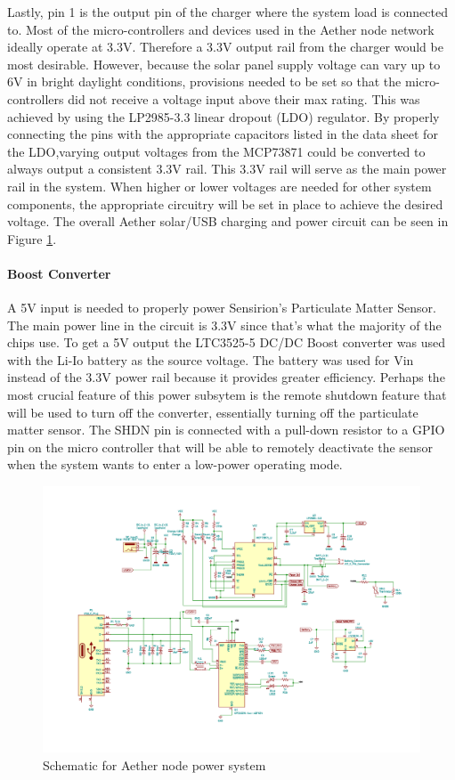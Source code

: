 Lastly, pin 1 is the output pin of the charger where the system load is connected to. Most of the micro-controllers and devices used in the Aether node network ideally operate at 3.3V. Therefore a 3.3V output rail from the charger would be most desirable. However, because the solar panel supply voltage can vary up to 6V in bright daylight conditions, provisions needed to be set so that the micro-controllers did not receive a voltage input above their max rating. This was achieved by using the LP2985-3.3 linear dropout (LDO) regulator. By properly connecting the pins with the appropriate capacitors listed in the data sheet for the LDO,varying output voltages from the MCP73871 could be converted to always output a consistent 3.3V rail. This 3.3V rail will serve as the main power rail in the system. When higher or lower voltages are needed for other system components, the appropriate circuitry will be set in place to achieve the desired voltage. The overall Aether solar/USB charging and power circuit can be seen in Figure \ref{fig:power_schematic}.

\paragraph{Boost Converter}
A 5V input is needed to properly power Sensirion's Particulate Matter Sensor. The main power line in the circuit is 3.3V since that's what the majority of the chips use. To get a 5V output the LTC3525-5 DC/DC Boost converter was used with the Li-Io battery as the source voltage. The battery was used for Vin instead of the 3.3V power rail because it provides greater efficiency. Perhaps the most crucial feature of this power subsytem is the remote shutdown feature that will be used to turn off the converter, essentially turning off the particulate matter sensor. The SHDN pin is connected with a pull-down resistor to a GPIO pin on the micro controller that will be able to remotely deactivate the sensor when the system wants to enter a low-power operating mode. 

\begin{figure}
    \centering
    \includegraphics[scale=0.5]{figures/Power_Schematic.jpg}
    \caption{Schematic for Aether node power system}
    \label{fig:power_schematic} 
\end{figure}
